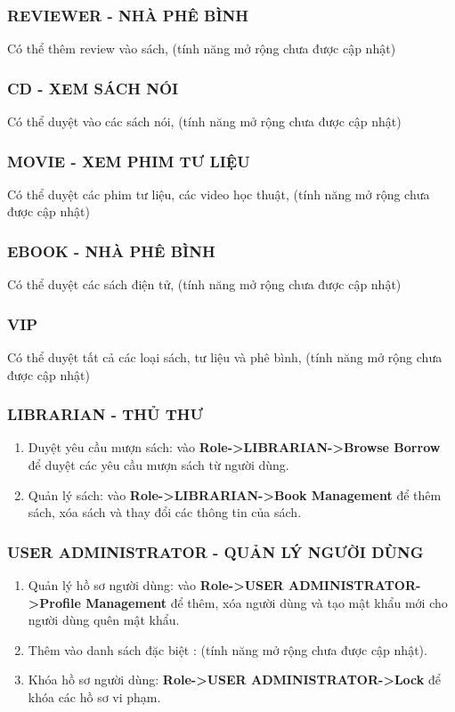 \documentclass[12pt,a4paper]{report}
\begin{document}
			\subsubsection{REVIEWER - NHÀ PHÊ BÌNH}
			Có thể thêm review vào sách, (tính năng mở rộng chưa được cập nhật)\\
			\subsubsection{CD - XEM SÁCH NÓI}
			Có thể duyệt vào các sách nói, (tính năng mở rộng chưa được cập nhật)\\
			\subsubsection{MOVIE - XEM PHIM TƯ LIỆU}
			Có thể duyệt các phim tư liệu, các video học thuật, (tính năng mở rộng chưa được cập nhật)\\
			\subsubsection{EBOOK - NHÀ PHÊ BÌNH}
			Có thể duyệt các sách điện tử, (tính năng mở rộng chưa được cập nhật)\\
			\subsubsection{VIP}
			Có thể duyệt tất cả các loại sách, tư liệu và phê bình, (tính năng mở rộng chưa được cập nhật)\\
			\subsubsection{LIBRARIAN - THỦ THƯ}
				\begin{enumerate}
					\item Duyệt yêu cầu mượn sách: vào \textbf{Role->LIBRARIAN->Browse Borrow} để duyệt các yêu cầu mượn sách từ người dùng.
					\item Quản lý sách: vào \textbf{Role->LIBRARIAN->Book Management} để thêm sách, xóa sách và thay đổi các thông tin của sách.
				\end{enumerate}
			\subsubsection{USER ADMINISTRATOR - QUẢN LÝ NGƯỜI DÙNG}
				\begin{enumerate}
					\item Quản lý hồ sơ người dùng: vào \textbf{Role->USER ADMINISTRATOR->Profile Management} để thêm, xóa người dùng và tạo mật khẩu mới cho người dùng quên mật khẩu.
					\item Thêm vào danh sách đặc biệt : (tính năng mở rộng chưa được cập nhật).
					\item Khóa hồ sơ người dùng: \textbf{Role->USER ADMINISTRATOR->Lock} để khóa các hồ sơ vi phạm.
				\end{enumerate}
\end{document}
